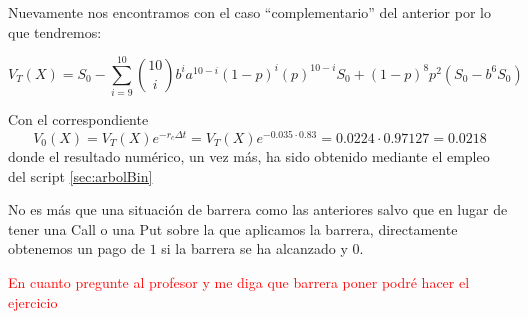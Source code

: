 \begin{problem}[2]
\spart

Nuevamente nos encontramos con el caso ``complementario'' del anterior por lo que tendremos:

\[V_T(X) = S_0 -\sum_{i=9}^{10}{10 \choose i}b^{i}a^{10-i}(1-p)^i(p)^{10-i}S_0+(1-p)^8p^2(S_0-b^6S_0)\]

Con el correspondiente
\[V_0(X)=V_T(X)e^{-r_cΔt}=V_T(X)e^{-0.035\cdot 0.83} = 0.0224 \cdot 0.97127 = 0.0218\]
donde el resultado numérico, un vez más, ha sido obtenido mediante el empleo del script \ref{sec:arbolBin}

\spart

No es más que una situación de barrera como las anteriores salvo que en lugar de tener una Call o una Put sobre la que aplicamos la barrera, directamente obtenemos un pago de $1$ si la barrera se ha alcanzado y $0$.

\textcolor{red}{En cuanto pregunte al profesor y me diga que barrera poner podré hacer el ejercicio}

\end{problem}

